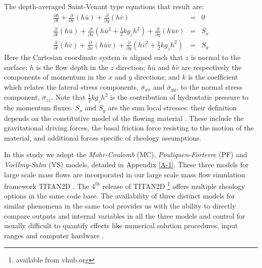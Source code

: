 \documentclass[nhess, manuscript]{copernicus}
\begin{document}
The depth-averaged Saint-Venant type equations that result are:
\begin{eqnarray}
\label{eq:D_A}
\frac{\partial h}{\partial t} +
\frac{\partial}{\partial x}(h \bar{u}) +
\frac{\partial}{\partial y}(h\bar{v}) &=& 0 \nonumber \\
\frac{\partial}{\partial t} (h\bar{u}) +
\frac{\partial}{\partial x}\left(h\bar{u}^2 + \frac{1}{2}k g_{z}h^2\right) + \frac{\partial}{\partial y}(h\bar{u}\bar{v}) &=& S_{x}\\
\frac{\partial}{\partial t} (h\bar{v}) +
\frac{\partial}{\partial x}(h\bar{u}\bar{v}) +
\frac{\partial}{\partial y}\left(h\bar{v}^2 + \frac{1}{2}k g_{z}h^2\right) &=& S_{y} \nonumber
\end{eqnarray}
Here the Cartesian coordinate system is aligned such that $z$ is normal to the surface; $h$ is the flow depth in the $z$ direction; $h\bar{u}$ and $h\bar{v}$ are respectively the components of momentum in the $x$ and $y$ directions; and $k$ is the coefficient which relates the lateral stress components, $\bar{\sigma}_{xx}$ and $\bar{\sigma}_{yy}$, to the normal stress component, $\bar{\sigma}_{zz}$. Note that $\frac{1}{2} k g_z h^2$ is the contribution of hydrostatic pressure to the momentum fluxes. $S_x$ and $S_y$ are the sum local stresses: their definition depends on the constitutive model of the flowing material \citep{Kelfoun2011}. These include the gravitational driving forces, the basal friction force resisting to the motion of the material, and additional forces specific of rheology assumptions.

In this study we adopt the \emph{Mohr-Coulomb} (MC), \emph{Pouliquen-Forterre} (PF) and \emph{Voellmy-Salm} (VS) models, detailed in Appendix  \ref{A-1}. These three models for large scale mass flows are incorporated in our large scale mass flow simulation framework  TITAN2D \citep{Patra2005}. The $\mathrm{4^{\mathrm{th}}}$ release of TITAN2D \footnote{available from vhub.org} offers multiple rheology options in the same code base. The availability of three distinct models for similar phenomena in the same tool provides us with the ability to directly compare  outputs and internal variables in all the three models and control for usually difficult to quantify effects like numerical solution procedures, input ranges and computer hardware \citep{Patra2018}.
\end{document}
